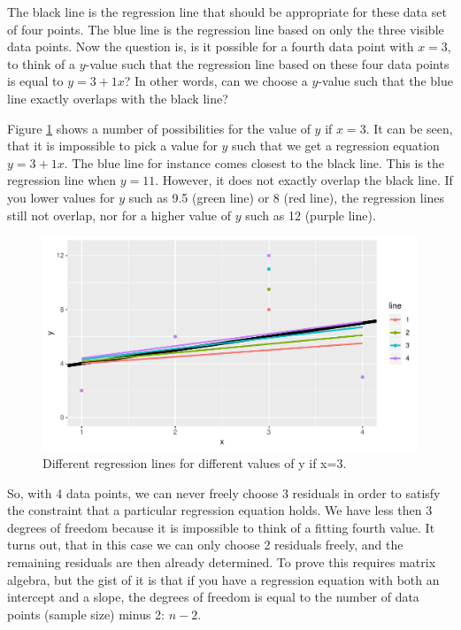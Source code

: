 \documentclass[]{book}\usepackage[]{graphicx}\usepackage[]{color}
\makeatletter
\def\maxwidth{ %
  \ifdim\Gin@nat@width>\linewidth
    \linewidth
  \else
    \Gin@nat@width
  \fi
}
\newenvironment{knitrout}{}{} %
\makeatother
\begin{document}
The black line is the regression line that should be appropriate for these data set of four points. The blue line is the regression line based on only the three visible data points. Now the question is, is it possible for a fourth data point with $x=3$, to think of a $y$-value such that the regression line based on these four data points is equal to $y=3+1x$? In other words, can we choose a $y$-value such that the blue line exactly overlaps with the black line?

Figure \ref{fig:inf_13} shows a number of possibilities for the value of $y$ if $x=3$. It can be seen, that it is impossible to pick a value for $y$ such that we get a regression equation $y=3+1x$. The blue line for instance comes closest to the black line. This is the regression line when $y=11$. However, it does not exactly overlap the black line. If you lower values for $y$ such as 9.5 (green line) or 8 (red line), the regression lines still not overlap, nor for a higher value of $y$ such as 12 (purple line).

\begin{knitrout}
\color{fgcolor}\begin{figure}

{\centering \includegraphics[width=\maxwidth]{figure/inf_13-1} 

}

\caption[Different regression lines for different values of y if x=3]{Different regression lines for different values of y if x=3.}\label{fig:inf_13}
\end{figure}


\end{knitrout}

So, with 4 data points, we can never freely choose 3 residuals in order to satisfy the constraint that a particular regression equation holds. We have less then 3 degrees of freedom because it is impossible to think of a fitting fourth value. It turns out, that in this case we can only choose 2 residuals freely, and the remaining residuals are then already determined. To prove this requires matrix algebra, but the gist of it is that if you have a regression equation with both an intercept and a slope, the degrees of freedom is equal to the number of data points (sample size) minus 2: $n-2$.
\end{document}
